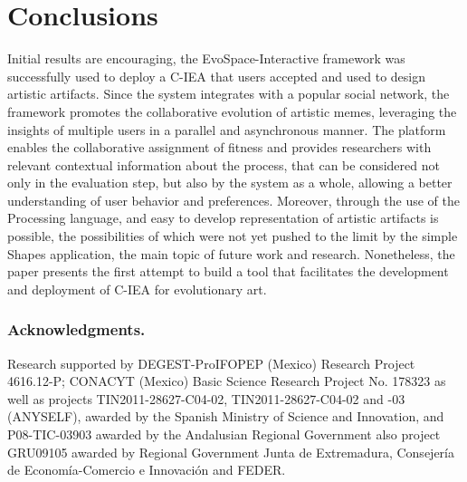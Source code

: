 \documentclass{llncs}
\begin{document}
\section{Conclusions}
\label{sec:conclusions}
Initial results are encouraging, the EvoSpace-Interactive framework was successfully used to deploy a C-IEA that users accepted and used to design artistic artifacts.
Since the system integrates with a popular social network, the framework promotes the collaborative evolution of artistic memes,
leveraging the insights of multiple users in a parallel and asynchronous manner. The platform enables the collaborative assignment of fitness and provides researchers with relevant contextual information about the process, that can be considered not only in the evaluation step, but also by the system as a whole, allowing a better understanding of user behavior and preferences.
Moreover, through the use of the Processing language, and easy to develop representation of artistic artifacts is possible,
the possibilities of which were not yet pushed to the limit by the simple Shapes application, the main topic of future work and research. Nonetheless, the paper presents the first attempt to build a tool that facilitates the development and deployment of C-IEA for evolutionary art.

\subsubsection*{Acknowledgments.}
\begin{small}
Research supported by DEGEST-ProIFOPEP (Mexico) Research Project 4616.12-P;
CONACYT (Mexico) Basic Science Research Project No. 178323
as well as projects TIN2011-28627-C04-02, TIN2011-28627-C04-02 and -03 (ANYSELF),
awarded by the Spanish Ministry of Science and Innovation, and P08-TIC-03903 awarded by the Andalusian Regional Government also project GRU09105 awarded by Regional Government Junta de Extremadura, Consejería de Economía-Comercio e Innovación and FEDER.
\end{small}




\begin{footnotesize}

\end{footnotesize}
\end{document}
